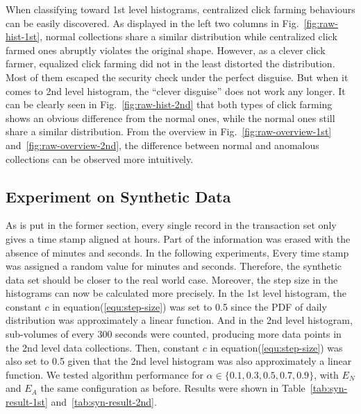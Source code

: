 \documentclass[a4paper]{IEEEtran}
\begin{document}
			When classifying toward 1st level histograms, centralized click farming behaviours can be easily discovered. As displayed in the left two columns in Fig.~\ref{fig:raw-hist-1st}, normal collections share a similar distribution while centralized click farmed ones abruptly violates the original shape. However, as a clever click farmer, equalized click farming did not in the least distorted the distribution. Most of them escaped the security check under the perfect disguise.
			But when it comes to 2nd level histogram, the ``clever disguise'' does not work any longer. It can be clearly seen in Fig.~\ref{fig:raw-hist-2nd} that both types of click farming shows an obvious difference from the normal ones, while the normal ones still share a similar distribution.
			From the overview in Fig.~\ref{fig:raw-overview-1st} and~\ref{fig:raw-overview-2nd}, the difference between normal and anomalous collections can be observed more intuitively.
			
		\subsection{Experiment on Synthetic Data}
			As is put in the former section, every single record in the transaction set only gives a time stamp aligned at hours. Part of the information was erased with the absence of minutes and seconds. In the following experiments, Every time stamp was assigned a random value for minutes and seconds. Therefore, the synthetic data set should be closer to the real world case. Moreover, the step size in the histograms can now be calculated more precisely. In the 1st level histogram, the constant $c$ in equation(\ref{equ:step-size}) was set to 0.5 since the PDF of daily distribution was approximately a linear function. And in the 2nd level histogram, sub-volumes of every 300 seconds were counted, producing more data points in the 2nd level data collections. Then, constant $c$ in equation(\ref{equ:step-size}) was also set to 0.5 given that the 2nd level histogram was also approximately a linear function.
			We tested algorithm performance for $\alpha \in \{0.1, 0.3, 0.5, 0.7, 0.9\}$, with $E_N$ and $E_A$ the same configuration as before. Results were shown in Table~\ref{tab:syn-result-1st} and~\ref{tab:syn-result-2nd}.
			
\end{document}
